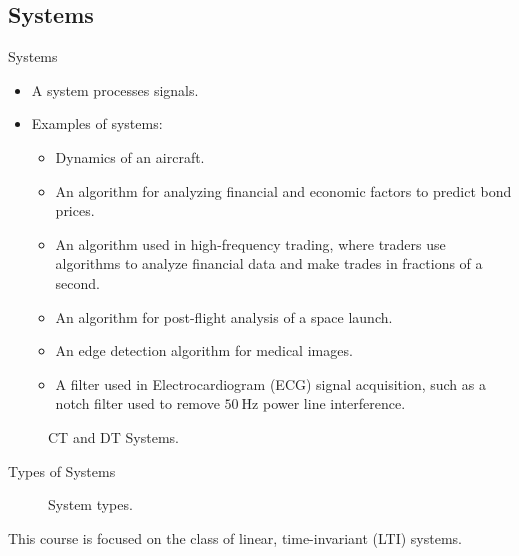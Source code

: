 \subsection{Systems}

\begin{frame}{Systems}
    \begin{itemize}[<+->]
        \item A system processes signals.
        \item Examples of systems:
            \begin{itemize}
                \item Dynamics of an aircraft.
                \item An algorithm for analyzing financial and economic factors to predict bond prices.
                \item An algorithm used in high-frequency trading, where traders use algorithms to analyze financial data and make trades in fractions of a second.
                \item An algorithm for post-flight analysis of a space launch.
                \item An edge detection algorithm for medical images.
                \item A filter used in Electrocardiogram (ECG) signal acquisition, such as a notch filter used to remove $50\:\mathrm{Hz}$ power line interference. 
            \end{itemize}
    \end{itemize}
    \pause
    \begin{figure}
        \centering
            
            
        \caption{CT and DT Systems.}\label{fi:ct_dt_systems}
    \end{figure}
\end{frame}


\begin{frame}[plain]{Types of Systems}
    \begin{figure}
        \centering
        
        \caption{System types.}\label{fi:system_types}
    \end{figure}
    This course is focused on the class of linear, time-invariant (LTI) systems.
\end{frame}


